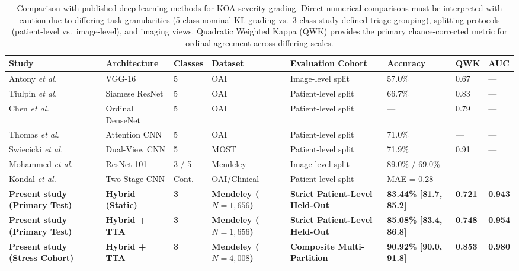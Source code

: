 \documentclass[10pt,journal]{IEEEtran}
\begin{document}
\begin{table}[t]
\centering
\caption{Comparison with published deep learning methods for KOA severity grading. Direct numerical comparisons must be interpreted with caution due to differing task granularities (5-class nominal KL grading vs.\ 3-class study-defined triage grouping), splitting protocols (patient-level vs.\ image-level), and imaging views. Quadratic Weighted Kappa (QWK) provides the primary chance-corrected metric for ordinal agreement across differing scales.}
\label{tab:comparison}
\scriptsize
\setlength{\tabcolsep}{4pt}
\renewcommand{\arraystretch}{1.1}
\begin{tabular}{p{3.2cm}p{2.3cm}p{1.0cm}p{2.0cm}p{2.6cm}p{1.8cm}p{1.1cm}p{1.2cm}}
\toprule
\textbf{Study} & \textbf{Architecture} & \textbf{Classes} & \textbf{Dataset} & \textbf{Evaluation Cohort} & \textbf{Accuracy} & \textbf{QWK} & \textbf{AUC} \\
\midrule
Antony \textit{et al.} \cite{antony2016quantifying} & VGG-16 & 5 & OAI & Image-level split & 57.0\% & 0.67 & --- \\
Tiulpin \textit{et al.} \cite{tiulpin2018automatic} & Siamese ResNet & 5 & OAI & Patient-level split & 66.7\% & 0.83 & --- \\
Chen \textit{et al.} \cite{chen2019fully} & Ordinal DenseNet & 5 & OAI & Patient-level split & --- & 0.79 & --- \\
Thomas \textit{et al.} \cite{thomas2020automated} & Attention CNN & 5 & OAI & Patient-level split & 71.0\% & --- & --- \\
Swiecicki \textit{et al.} \cite{swiecicki2021deep} & Dual-View CNN & 5 & MOST & Patient-level split & 71.9\% & 0.91 & --- \\
Mohammed \textit{et al.} \cite{bany2023knee} & ResNet-101 & 3 / 5 & Mendeley & Image-level split & 89.0\% / 69.0\% & --- & --- \\
Kondal \textit{et al.} \cite{kondal2023transfer} & Two-Stage CNN & Cont. & OAI/Clinical & Patient-level split & MAE = 0.28 & --- & --- \\
\midrule
\textbf{Present study (Primary Test)} & \textbf{Hybrid (Static)} & \textbf{3} & \textbf{Mendeley ($N=1{,}656$)} & \textbf{Strict Patient-Level Held-Out} & \textbf{83.44\% [81.7, 85.2]} & \textbf{0.721} & \textbf{0.943} \\
\textbf{Present study (Primary Test)} & \textbf{Hybrid + TTA} & \textbf{3} & \textbf{Mendeley ($N=1{,}656$)} & \textbf{Strict Patient-Level Held-Out} & \textbf{85.08\% [83.4, 86.8]} & \textbf{0.748} & \textbf{0.954} \\
\textbf{Present study (Stress Cohort)} & \textbf{Hybrid + TTA} & \textbf{3} & \textbf{Mendeley ($N=4{,}008$)} & \textbf{Composite Multi-Partition} & \textbf{90.92\% [90.0, 91.8]} & \textbf{0.853} & \textbf{0.980} \\
\bottomrule
\end{tabular}
\end{table}
\end{document}

